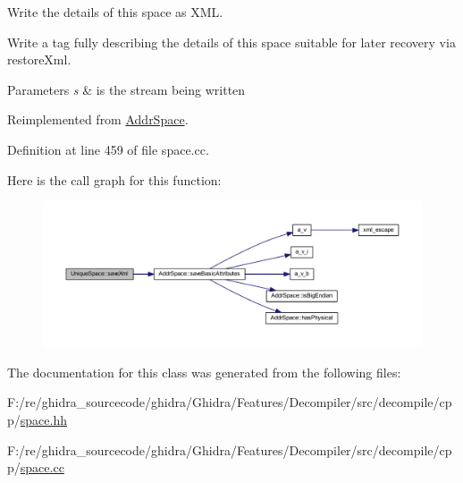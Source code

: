 Write the details of this space as X\+ML. 

Write a tag fully describing the details of this space suitable for later recovery via restore\+Xml. 
\begin{DoxyParams}{Parameters}
{\em s} & is the stream being written \\
\hline
\end{DoxyParams}


Reimplemented from \mbox{\hyperlink{class_addr_space_ac073a4d446677c54d769abba01318864}{Addr\+Space}}.



Definition at line 459 of file space.\+cc.

Here is the call graph for this function\+:
\nopagebreak
\begin{figure}[H]
\begin{center}
\leavevmode
\includegraphics[width=350pt]{class_unique_space_a119a41fbbdc811d44d532451ae2785f4_cgraph}
\end{center}
\end{figure}


The documentation for this class was generated from the following files\+:\begin{DoxyCompactItemize}
\item 
F\+:/re/ghidra\+\_\+sourcecode/ghidra/\+Ghidra/\+Features/\+Decompiler/src/decompile/cpp/\mbox{\hyperlink{space_8hh}{space.\+hh}}\item 
F\+:/re/ghidra\+\_\+sourcecode/ghidra/\+Ghidra/\+Features/\+Decompiler/src/decompile/cpp/\mbox{\hyperlink{space_8cc}{space.\+cc}}\end{DoxyCompactItemize}
